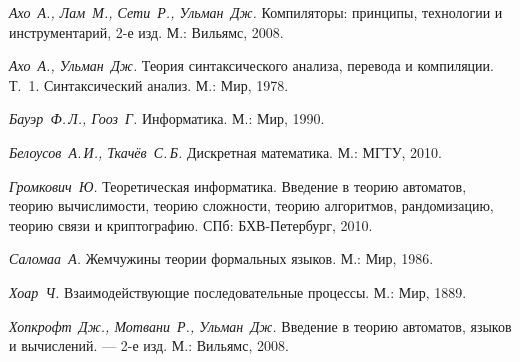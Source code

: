 
\begin{thebibliography}{9}


 \emph{Ахо~А., Лам~М., Сети~Р., Ульман~Дж.} Компиляторы: принципы, технологии и инструментарий, 2-е изд. М.: Вильямс, 2008.

 \emph{Ахо~А., Ульман~Дж.} Теория синтаксического анализа, перевода и компиляции. Т.~1. Синтаксический анализ. М.: Мир, 1978. 

 \emph{Бауэр~Ф.\,Л., Гооз~Г.} Информатика. М.: Мир, 1990. 

 \emph{Белоусов~А.\,И., Ткачёв~С.\,Б.} Дискретная математика. М.: МГТУ, 2010.

 \emph{Громкович~Ю.} Теоретическая информатика. Введение в теорию автоматов, теорию вычислимости, теорию сложности, теорию алгоритмов, рандомизацию, теорию связи и криптографию. СПб: БХВ-Петербург, 2010.

 \emph{Саломаа~А.} Жемчужины теории формальных языков. М.: Мир, 1986. 


 \emph{Хоар~Ч.} Взаимодействующие последовательные процессы. М.: Мир, 1889.

 \emph{Хопкрофт~Дж., Мотвани~Р., Ульман~Дж.}  Введение в теорию автоматов, языков и
вычислений. — 2-е изд. М.: Вильямс, 2008.


\end{thebibliography}
